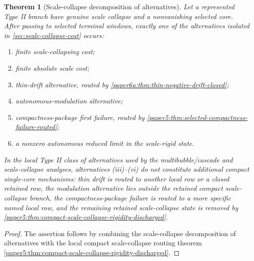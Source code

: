 \documentclass[11pt]{amsart}
\theoremstyle{plain}
\newtheorem{theorem}{Theorem}[section]
\theoremstyle{definition}
\theoremstyle{remark}
\begin{document}
\begin{theorem}[Scale-collapse decomposition of alternatives]
\label{paper6:thm:scale-stratification}
Let a represented Type II branch have genuine scale collapse and a nonvanishing
selected core.  After passing to selected terminal windows, exactly one of the
alternatives isolated in \cref{sec:scale-collapse-cost} occurs:
\begin{enumerate}[label=\textup{(\roman*)}]
\item finite scale-collapsing cost;
\item finite absolute scale cost;
\item thin-drift alternative, routed by
\cref{paper6a:thm:thin-negative-drift-closed};
\item autonomous-modulation alternative;
\item compactness-package first failure, routed by
\cref{paper5:thm:selected-compactness-failure-routed};
\item a nonzero autonomous reduced limit in the scale-rigid state.
\end{enumerate}
In the local Type II class of alternatives used by the multibubble/cascade and
scale-collapse analyses, alternatives
\textup{(iii)}--\textup{(vi)} do not constitute additional compact single-core
mechanisms: thin drift is routed to another local row or a closed retained row,
the modulation alternative lies outside the retained compact scale-collapse
branch, the compactness-package failure is routed to a more specific named
local row, and the remaining retained scale-collapse state is removed by
\cref{paper5:thm:compact-scale-collapse-rigidity-discharged}.
\end{theorem}

\begin{proof}
The assertion follows by combining the scale-collapse decomposition of
alternatives with the local compact scale-collapse routing theorem
\cref{paper5:thm:compact-scale-collapse-rigidity-discharged}.
\end{proof}
\end{document}
